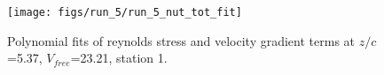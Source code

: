 \begin{figure}[H]
\centering
\texttt{[image: figs/run\_5/run\_5\_nut\_tot\_fit]}
\caption{Polynomial fits of reynolds stress and velocity gradient terms at $z/c$=5.37, $V_{free}$=23.21, station 1.}
\label{fig:run_5_nut_tot_fit}
\end{figure}


